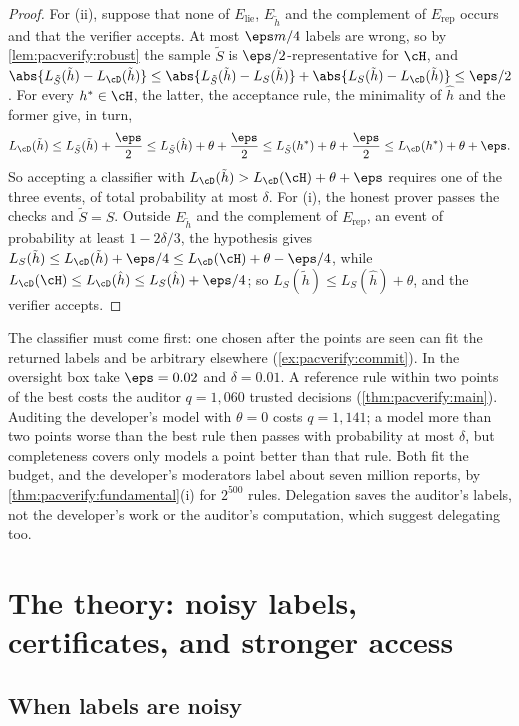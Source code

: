 \begin{refsection}
\begin{proof}
For (ii), suppose that none of $E_{\mathrm{lie}}$, $E_{\tilde h}$ and the complement of $E_{\mathrm{rep}}$ occurs and that the verifier accepts. At most $\eps m/4$ labels are wrong, so by \cref{lem:pacverify:robust} the sample $\tilde S$ is $\eps/2$-representative for $\cH$, and $\abs{L_{\tilde S}(\tilde h)-L_\cD(\tilde h)}\le\abs{L_{\tilde S}(\tilde h)-L_S(\tilde h)}+\abs{L_S(\tilde h)-L_\cD(\tilde h)}\le\eps/2$. For every $h^*\in\cH$, the latter, the acceptance rule, the minimality of $\hat h$ and the former give, in turn,
\[L_\cD(\tilde h)\le L_{\tilde S}(\tilde h)+\frac\eps2\le L_{\tilde S}(\hat h)+\theta+\frac\eps2\le L_{\tilde S}(h^*)+\theta+\frac\eps2\le L_\cD(h^*)+\theta+\eps.\]
So accepting a classifier with $L_\cD(\tilde h)>L_\cD(\cH)+\theta+\eps$ requires one of the three events, of total probability at most $\delta$. For (i), the honest prover passes the checks and $\tilde S=S$. Outside $E_{\tilde h}$ and the complement of $E_{\mathrm{rep}}$, an event of probability at least $1-2\delta/3$, the hypothesis gives $L_S(\tilde h)\le L_\cD(\tilde h)+\eps/4\le L_\cD(\cH)+\theta-\eps/4$, while $L_\cD(\cH)\le L_\cD(\hat h)\le L_S(\hat h)+\eps/4$; so $L_S(\tilde h)\le L_S(\hat h)+\theta$, and the verifier accepts.
\end{proof}

The classifier must come first: one chosen after the points are seen can fit the returned labels and be arbitrary elsewhere (\cref{ex:pacverify:commit}). In the oversight box take $\eps=0.02$ and $\delta=0.01$. A reference rule within two points of the best costs the auditor $q=1{,}060$ trusted decisions (\cref{thm:pacverify:main}). Auditing the developer's model with $\theta=0$ costs $q=1{,}141$; a model more than two points worse than the best rule then passes with probability at most $\delta$, but completeness covers only models a point better than that rule. Both fit the budget, and the developer's moderators label about seven million reports, by \cref{thm:pacverify:fundamental}(i) for $2^{500}$ rules. Delegation saves the auditor's labels, not the developer's work or the auditor's computation, which \textcite[Remark~5.5]{GoldwasserEtAl2021} suggest delegating too.

\section{The theory: noisy labels, certificates, and stronger access}\label{sec:pacverify:noisy}

\subsection{When labels are noisy}


\end{refsection}

